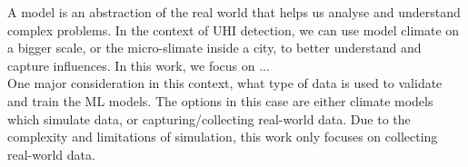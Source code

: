 A model is an abstraction of the real world that helps us analyse and understand complex problems. In the context of UHI detection, we can use model climate on a bigger scale, or the micro-slimate inside a city, to better understand and capture influences. In this work, we focus on ...\\
One major consideration in this context, what type of data is used to validate and train the ML models. The options in this case are either climate models which simulate data, or capturing/collecting real-world data. Due to the complexity and limitations of simulation, this work only focuses on collecting real-world data.


